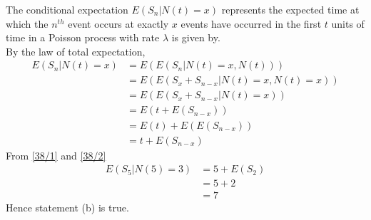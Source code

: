 \documentclass[journal,12pt,onecolumn]{IEEEtran}
\theoremstyle{remark}
\begin{document}
The conditional expectation $E(S_n|N(t)=x)$ represents the expected time at which the $n^{th}$ event occurs at exactly $x$ events have occurred in the first $t$ units of time in a Poisson process with rate $\lambda$ is given by.\\
By the law of total expectation,
\begin{align}
E(S_n | N(t) = x) &= E(E(S_n | N(t) = x, N(t))) \\
&= E(E(S_x + S_{n-x} | N(t) = x, N(t) = x))\\
&= E(E(S_x + S_{n-x} | N(t) = x))\\
&=E(t + E(S_{n-x})) \\
&=E(t) + E(E(S_{n-x}))\\
 &= t + E(S_{n-x}) \label{38/2}
 \end{align}
 From \eqref{38/1} and \eqref{38/2}\\
 \begin{align}
 E(S_5|N(5)=3)&=5+E(S_2)\\
 &=5+2\\
 &=7
 \end{align}
 Hence statement (b) is true.\\
\end{document}
